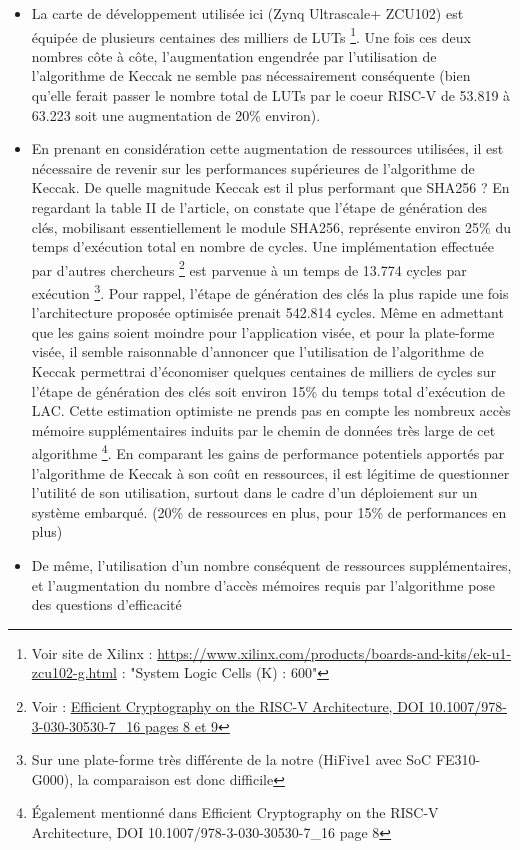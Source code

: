\documentclass[10pt,a4paper]{article}
\begin{document}
\begin{itemize}
    \item La carte de développement utilisée ici (Zynq Ultrascale+ ZCU102) est équipée de plusieurs centaines des milliers de LUTs \footnote{Voir site de Xilinx : 
    \url{https://www.xilinx.com/products/boards-and-kits/ek-u1-zcu102-g.html} : "System Logic Cells (K) : 600"}. 
Une fois ces deux nombres côte à côte, l'augmentation engendrée par l'utilisation de l'algorithme de Keccak ne semble pas nécessairement conséquente (bien qu'elle 
ferait passer le nombre total de LUTs par le coeur RISC-V de 53.819 à 63.223 soit une augmentation de 20\% environ).
    \item En prenant en considération cette augmentation de ressources utilisées, il est nécessaire de revenir sur les performances supérieures de  
 l'algorithme de Keccak. De quelle magnitude Keccak est il plus performant que SHA256 ? En regardant la table II de l'article, on constate que l'étape de génération 
 des clés, mobilisant essentiellement le module SHA256, représente environ 25\% du temps d'exécution total en nombre de cycles. Une implémentation effectuée par d'autres 
 chercheurs \footnote{Voir : \href{https://eprint.iacr.org/2019/794.pdf}{Efficient Cryptography on the RISC-V Architecture, DOI 10.1007/978-3-030-30530-7\_16 pages 8 et 9}} est parvenue 
 à un temps de 13.774 cycles par exécution \footnote{Sur une plate-forme très différente de la notre (HiFive1 avec SoC FE310-G000), la comparaison est donc difficile}. 
 Pour rappel, l'étape de génération des clés la plus rapide une fois l'architecture proposée optimisée prenait 542.814 cycles. Même en admettant que les gains soient moindre 
 pour l'application visée, et pour la plate-forme visée, il semble raisonnable d'annoncer que l'utilisation de l'algorithme de Keccak permettrai d'économiser quelques centaines 
 de milliers de cycles sur l'étape de génération des clés soit environ 15\% du temps total d'exécution de LAC. Cette estimation optimiste ne prends pas en compte les nombreux accès 
 mémoire supplémentaires induits par le chemin de données très large de cet algorithme \footnote{Également mentionné dans Efficient Cryptography on the RISC-V Architecture, DOI 10.1007/978-3-030-30530-7\_16 page 8}. 
 En comparant les gains de performance potentiels apportés par l'algorithme de Keccak à son coût en ressources, il est légitime de questionner l'utilité de son utilisation, surtout dans le cadre 
 d'un déploiement sur un système embarqué. (20\% de ressources en plus, pour 15\% de performances en plus)
    \item De même, l'utilisation d'un nombre conséquent de ressources supplémentaires, et l'augmentation du nombre d'accès mémoires requis par l'algorithme pose des questions d'efficacité 

\end{itemize}
\end{document}

